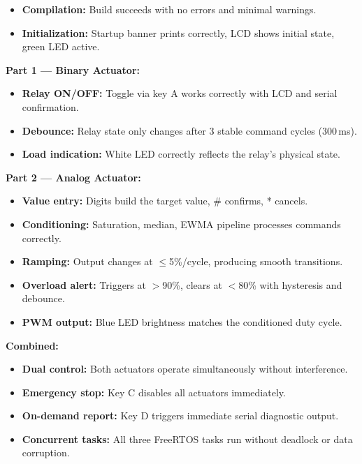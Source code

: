 \begin{itemize}
    \item \textbf{Compilation:} Build succeeds with no errors and minimal warnings.
    \item \textbf{Initialization:} Startup banner prints correctly, LCD shows initial state, green LED active.
\end{itemize}

\textbf{Part 1 --- Binary Actuator:}
\begin{itemize}
    \item \textbf{Relay ON/OFF:} Toggle via key A works correctly with LCD and serial confirmation.
    \item \textbf{Debounce:} Relay state only changes after 3 stable command cycles (300\,ms).
    \item \textbf{Load indication:} White LED correctly reflects the relay's physical state.
\end{itemize}

\textbf{Part 2 --- Analog Actuator:}
\begin{itemize}
    \item \textbf{Value entry:} Digits build the target value, \# confirms, * cancels.
    \item \textbf{Conditioning:} Saturation, median, EWMA pipeline processes commands correctly.
    \item \textbf{Ramping:} Output changes at $\leq$5\%/cycle, producing smooth transitions.
    \item \textbf{Overload alert:} Triggers at $>$90\%, clears at $<$80\% with hysteresis and debounce.
    \item \textbf{PWM output:} Blue LED brightness matches the conditioned duty cycle.
\end{itemize}

\textbf{Combined:}
\begin{itemize}
    \item \textbf{Dual control:} Both actuators operate simultaneously without interference.
    \item \textbf{Emergency stop:} Key C disables all actuators immediately.
    \item \textbf{On-demand report:} Key D triggers immediate serial diagnostic output.
    \item \textbf{Concurrent tasks:} All three FreeRTOS tasks run without deadlock or data corruption.
\end{itemize}
